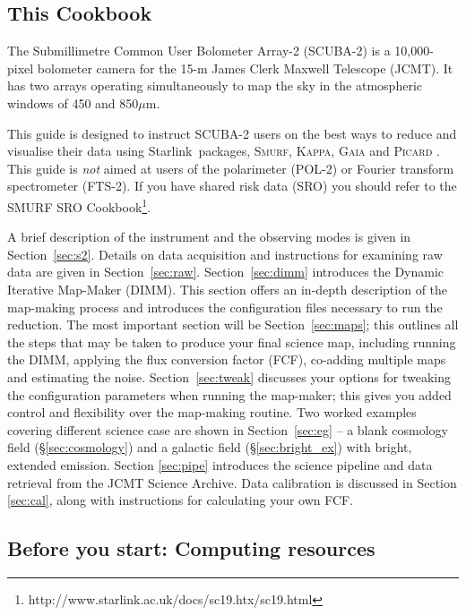 \documentclass[twoside,11pt]{article}
\newcommand{\htmladdnormallink}[2]{#1}
\newcommand{\xref}[3]{#1}
\newcommand{\xlabel}[1]{}
\renewcommand{\_}{\texttt{\symbol{95}}}
\newcommand{\starlink}{\htmladdnormallink{Starlink}{http://starlink.jach.hawaii.edu}}
\newcommand{\gaia}{\xref{\textsc{Gaia}}{sun214}{}}
\newcommand{\Kappa}{\xref{\textsc{Kappa}}{sun95}{}}
\newcommand{\picard}{\xref{\textsc{Picard}}{sun265}{}}
\newcommand{\smurf}{\xref{\textsc{Smurf}}{sun258}{}}
\begin{document}
\subsection{\xlabel{using_guide}This Cookbook}

The Submillimetre Common User Bolometer Array-2 (SCUBA-2) is a
10,000-pixel bolometer camera for the 15-m James Clerk Maxwell
Telescope (JCMT). It has two arrays operating simultaneously to map
the sky in the atmospheric windows of 450 and 850$\mu$m.

This guide is designed to instruct SCUBA-2 users on the best ways to
reduce and visualise their data using \starlink\ packages,
\smurf \cite{smurf}, \Kappa \cite{kappa}, \gaia \cite{gaia} and \picard
\cite{picard}.  This guide is {\em not} aimed at users of the
polarimeter (POL-2) or Fourier transform spectrometer (FTS-2). If you
have shared risk data (SRO) you should refer to the SMURF SRO
Cookbook\footnote{http://www.starlink.ac.uk/docs/sc19.htx/sc19.html}.

A brief description of the instrument and the observing modes is given
in Section~\ref{sec:s2}. Details on data acquisition and instructions
for examining raw data are given in Section~\ref{sec:raw}.
Section~\ref{sec:dimm} introduces the Dynamic Iterative Map-Maker
(DIMM). This section offers an in-depth description of the map-making
process and introduces the configuration files necessary to run the
reduction. The most important section will be Section~\ref{sec:maps};
this outlines all the steps that may be taken to produce your final
science map, including running the DIMM, applying the flux conversion
factor (FCF), co-adding multiple maps and estimating the noise.
Section~\ref{sec:tweak} discusses your options for tweaking the configuration
parameters when running the map-maker; this gives you added control
and flexibility over the map-making routine. Two worked examples
covering different science case are shown in Section~\ref{sec:eg} -- a
blank cosmology field (\S\ref{sec:cosmology}) and a galactic field
(\S\ref{sec:bright_ex}) with bright, extended emission. Section
\ref{sec:pipe} introduces the science pipeline and data retrieval from
the JCMT Science Archive.  Data calibration is discussed in Section
\ref{sec:cal}, along with instructions for calculating your own FCF.

\subsection{\xlabel{computing}Before you start: Computing resources}
\end{document}
